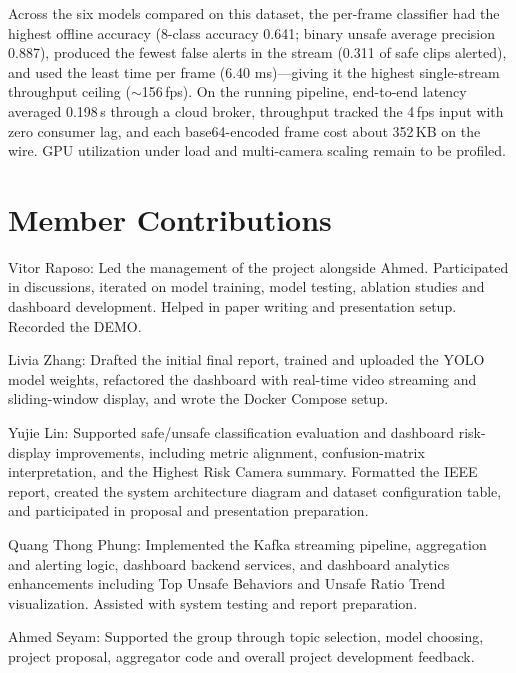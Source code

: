 \documentclass[conference]{IEEEtran}
\begin{document}
Across the six models compared on this dataset, the per-frame classifier
had the highest offline accuracy (8-class accuracy 0.641; binary unsafe
average precision 0.887), produced the fewest false alerts in the stream
(0.311 of safe clips alerted), and used the least time per frame
(6.40 ms)---giving it the highest single-stream throughput ceiling
($\sim$156\,fps). On the running pipeline, end-to-end latency averaged
0.198\,s through a cloud broker, throughput tracked the 4\,fps input with zero
consumer lag, and each base64-encoded frame cost about 352\,KB on the wire. GPU
utilization under load and multi-camera scaling remain to be profiled.



\section*{Member Contributions}
Vitor Raposo: Led the management of the project alongside Ahmed. Participated in discussions, iterated on model training, model testing, ablation studies and dashboard development. Helped in paper writing and presentation setup. Recorded the DEMO.

Livia Zhang: Drafted the initial final report, trained and uploaded the YOLO model weights, refactored the dashboard with real-time video streaming and sliding-window display, and wrote the Docker Compose setup.

Yujie Lin: Supported safe/unsafe classification evaluation and dashboard risk-display improvements, including metric alignment, confusion-matrix interpretation, and the Highest Risk Camera summary. Formatted the IEEE report, created the system architecture diagram and dataset configuration table, and participated in proposal and presentation preparation.


Quang Thong Phung: Implemented the Kafka streaming pipeline, aggregation and alerting logic, dashboard backend services, and dashboard analytics enhancements including Top Unsafe Behaviors and Unsafe Ratio Trend visualization. Assisted with system testing and report preparation.

Ahmed Seyam: Supported the group through topic selection, model choosing, project proposal, aggregator code and overall project development feedback.
\end{document}
